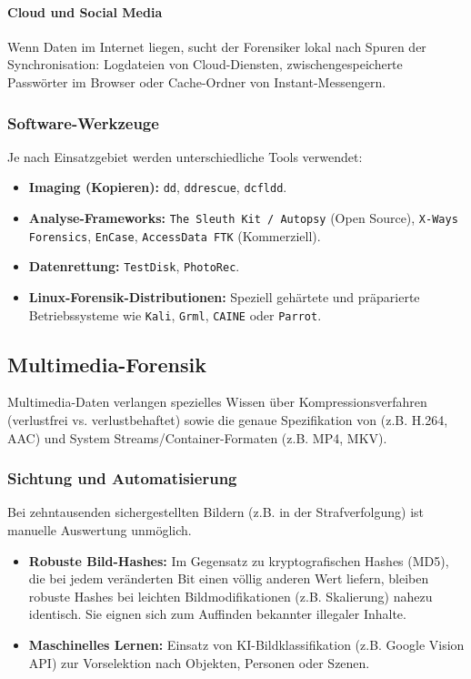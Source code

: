 \documentclass[
../../css_summary.tex,
]{subfiles}
\begin{document}
\paragraph{Cloud und Social Media}
Wenn Daten im Internet liegen, sucht der Forensiker lokal nach Spuren der Synchronisation: Logdateien von Cloud-Diensten, zwischengespeicherte Passwörter im Browser oder Cache-Ordner von Instant-Messengern.

\subsubsection{Software-Werkzeuge}
Je nach Einsatzgebiet werden unterschiedliche Tools verwendet:
\begin{itemize}
  \item \textbf{Imaging (Kopieren):} \texttt{dd}, \texttt{ddrescue}, \texttt{dcfldd}.
  \item \textbf{Analyse-Frameworks:} \texttt{The Sleuth Kit / Autopsy} (Open Source), \texttt{X-Ways Forensics}, \texttt{EnCase}, \texttt{AccessData FTK} (Kommerziell). %
  \item \textbf{Datenrettung:} \texttt{TestDisk}, \texttt{PhotoRec}.
  \item \textbf{Linux-Forensik-Distributionen:} Speziell gehärtete und präparierte Betriebssysteme wie \texttt{Kali}, \texttt{Grml}, \texttt{CAINE} oder \texttt{Parrot}.
\end{itemize}

\subsection{Multimedia-Forensik}
Multimedia-Daten verlangen spezielles Wissen über Kompressionsverfahren (verlustfrei vs. verlustbehaftet) sowie die genaue Spezifikation von  (z.B. H.264, AAC) und System Streams/Container-Formaten (z.B. MP4, MKV).

\subsubsection{Sichtung und Automatisierung}
Bei zehntausenden sichergestellten Bildern (z.B. in der Strafverfolgung) ist manuelle Auswertung unmöglich.
\begin{itemize}
  \item \textbf{Robuste Bild-Hashes:} Im Gegensatz zu kryptografischen Hashes (MD5), die bei jedem veränderten Bit einen völlig anderen Wert liefern, bleiben robuste Hashes bei leichten Bildmodifikationen (z.B. Skalierung) nahezu identisch. Sie eignen sich zum Auffinden bekannter illegaler Inhalte.
  \item \textbf{Maschinelles Lernen:} Einsatz von KI-Bildklassifikation (z.B. Google Vision API) zur Vorselektion nach Objekten, Personen oder Szenen.
\end{itemize}
\end{document}
